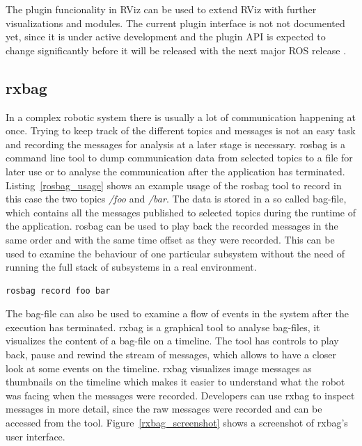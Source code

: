 The plugin funcionality in RViz can be used to extend RViz with further visualizations and modules. The current plugin interface is not not documented yet, since it is under active development and the plugin API is expected to change significantly before it will be released with the next major ROS release \cite{rvizPlugin}.

\subsection{rxbag}
In a complex robotic system there is usually a lot of communication happening at once. Trying to keep track of the different topics and messages is not an easy task and recording the messages for analysis at a later stage is necessary. rosbag is a command line tool to dump communication data from selected topics to a file for later use or to analyse the communication after the application has terminated. Listing~\ref{rosbag_usage} shows an example usage of the rosbag tool to record in this case the two topics \emph{/foo} and \emph{/bar}. The data is stored in a so called bag-file, which contains all the messages published to selected topics during the runtime of the application. rosbag can be used to play back the recorded messages in the same order and with the same time offset as they were recorded. This can be used to examine the behaviour of one particular subsystem without the need of running the full stack of subsystems in a real environment.

\begin{lstlisting}[frame=single,caption={Example usage of rosbag.},label=rosbag_usage]
rosbag record foo bar
\end{lstlisting}

The bag-file can also be used to examine a flow of events in the system after the execution has terminated. rxbag is a graphical tool to analyse bag-files, it visualizes the content of a bag-file on a timeline. The tool has controls to play back, pause and rewind the stream of messages, which allows to have a closer look at some events on the timeline. rxbag visualizes image messages as thumbnails on the timeline which makes it easier to understand what the robot was facing when the messages were recorded. Developers can use rxbag to inspect messages in more detail, since the raw messages were recorded and can be accessed from the tool. Figure~\ref{rxbag_screenshot} shows a screenshot of rxbag's user interface.

